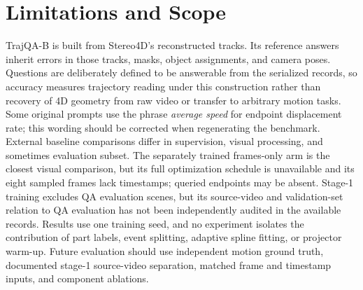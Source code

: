 \clearpage

\section{Limitations and Scope}
\label{app:limitations}
TrajQA-B is built from Stereo4D's reconstructed tracks. Its reference answers inherit errors in those tracks, masks, object assignments, and camera poses. Questions are deliberately defined to be answerable from the serialized records, so accuracy measures trajectory reading under this construction rather than recovery of 4D geometry from raw video or transfer to arbitrary motion tasks. Some original prompts use the phrase \emph{average speed} for endpoint displacement rate; this wording should be corrected when regenerating the benchmark. External baseline comparisons differ in supervision, visual processing, and sometimes evaluation subset. The separately trained frames-only arm is the closest visual comparison, but its full optimization schedule is unavailable and its eight sampled frames lack timestamps; queried endpoints may be absent. Stage-1 training excludes QA evaluation scenes, but its source-video and validation-set relation to QA evaluation has not been independently audited in the available records. Results use one training seed, and no experiment isolates the contribution of part labels, event splitting, adaptive spline fitting, or projector warm-up. Future evaluation should use independent motion ground truth, documented stage-1 source-video separation, matched frame and timestamp inputs, and component ablations.
